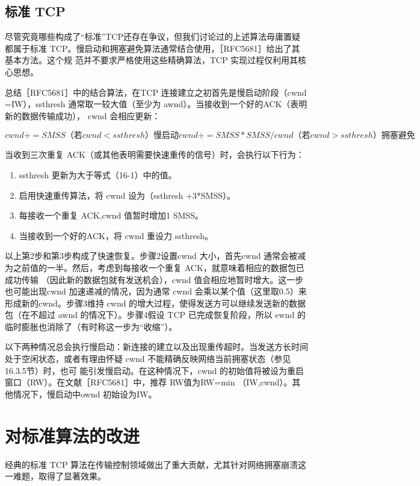 \subsection{标准 TCP}
尽管究竟哪些构成了“标准”TCP还存在争议，但我们讨论过的上述算法毋庸置疑都属于标准 TCP。慢启动和拥塞避免算法通常结合使用，［RFC5681］给出了其基本方法。这个规
范并不要求严格使用这些精确算法，TCP 实现过程仅利用其核心思想。

总结［RFC5681］中的结合算法，在TCP 连接建立之初首先是慢启动阶段（cwnd =IW），ssthresh 通常取一较大值（至少为 awnd）。当接收到一个好的ACK（表明新的数据传输成功），
cwnd 会相应更新：

\begin{equation}
    cwnd += SMSS（若 cwnd < ssthresh）慢启动
    cwnd += SMSS*SMSS/cwnd（若 cwnd>ssthresh）拥塞避免
\end{equation}

当收到三次重复 ACK（或其他表明需要快速重传的信号）时，会执行以下行为：
\begin{enumerate}
    \item ssthresh 更新为大于等式（16-1）中的值。
    \item 启用快速重传算法，将 cwnd 设为（ssthresh +3*SMSS）。
    \item 每接收一个重复 ACK,cwnd 值暂时增加1 SMSS。
    \item 当接收到一个好的ACK，将 cwnd 重设力 ssthresh。
\end{enumerate}

以上第2步和第3步构成了快速恢复。步骤2设置cwnd 大小，首先cwnd 通常会被减为之前值的一半。然后，考虑到每接收一个重复 ACK，就意味着相应的数据包已成功传输
（因此新的数据包就有发送机会），cwnd 值会相应地暂时增大。这一步也可能出现cwnd 加速递减的情况，因为通常 cwnd 会乘以某个值（这里取0.5）来形成新的cwnd。步骤3维持
cwnd 的增大过程，使得发送方可以继续发送新的数据包（在不超过 awnd 的情况下）。步骤4假设 TCP 已完成恢复阶段，所以 ewnd 的临时膨胀也消除了（有时称这一步为“收缩”）。

以下两种情况总会执行慢启动：新连接的建立以及出现重传超时。当发送方长时间处于空闲状态，或者有理由怀疑 cwnd 不能精确反映网络当前拥塞状态（参见16.3.5节）时，也可
能引发慢启动。在这种情况下，cwnd 的初始值将被设为重启窗口（RW）。在文献［RFC5681］中，推荐 RW值为RW=min （IW,cwnd）。其他情况下，慢启动中ownd 初始设为IW。

\section{对标准算法的改进}
经典的标准 TCP 算法在传输控制领域做出了重大贡献，尤其针对网络拥塞崩溃这一难题，取得了显著效果。


